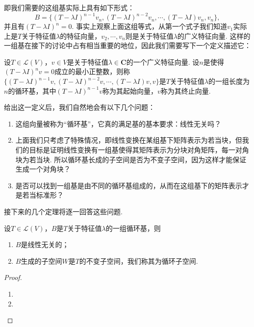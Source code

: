 即我们需要的这组基实际上具有如下形式：
\[B=\{(T-\lambda I)^{n-1}v_n,(T-\lambda I)^{n-2}v_n,\cdots,(T-\lambda I)v_n,v_n\},\]
并且有$(T-\lambda I)^n=0$. 事实上观察上面这组等式，从第一个式子我们知道$v_1$实际上是$T$关于特征值$\lambda$的特征向量，$v_2,\cdots,v_n$则是关于特征值$\lambda$的广义特征向量. 这样的一组基在接下的讨论中占有相当重要的地位，因此我们需要写下一个定义描述它：
\begin{definition}
    设$T\in\mathcal{L}(V)$，$v\in V$是关于特征值$\lambda\in\mathbf{C}$的一个广义特征向量. 设$n$是使得$(T-\lambda I)^n v=0$成立的最小正整数，则称$\{(T-\lambda I)^{n-1}v,(T-\lambda I)^{n-2}v,\cdots,(T-\lambda I)v,v\}$是$T$关于特征值$\lambda$的一组长度为$n$的循环基，其中$(T-\lambda I)^{n-1}v$称为其起始向量，$v$称为其终止向量.
\end{definition}

给出这一定义后，我们自然地会有以下几个问题：
\begin{enumerate}
    \item 这组向量被称为``循环基''，它真的满足基的基本要求：线性无关吗？
    \item 上面我们只考虑了特殊情况，即线性变换在某组基下矩阵表示为若当块，但我们的目标是证明线性变换有一组基使得其矩阵表示为分块对角矩阵，每一对角块为若当块. 所以循环基长成的子空间是否为不变子空间，因为这样才能保证生成一个对角块？
    \item 是否可以找到一组基是由不同的循环基组成的，从而在这组基下的矩阵表示才是若当标准形？
\end{enumerate}

接下来的几个定理将逐一回答这些问题.
\begin{theorem}
    设$T\in\mathcal{L}(V)$，$B$是$T$关于特征值$\lambda$的一组循环基，则
    \begin{enumerate}
        \item $B$是线性无关的；
        \item $B$生成的子空间$W$是$T$的不变子空间，我们称其为循环子空间.
    \end{enumerate}
\end{theorem}
\begin{proof}
    \begin{enumerate}
        \item
        \item
    \end{enumerate}
\end{proof}

